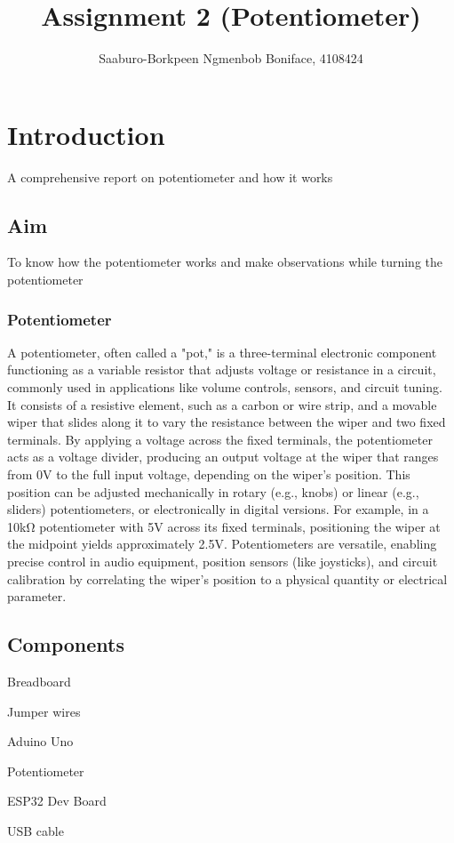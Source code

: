 \documentclass{article}
\title{Assignment 2 (Potentiometer)}
\author{Saaburo-Borkpeen Ngmenbob Boniface, 4108424}
\begin{document}
\maketitle


\section{Introduction}

A comprehensive report on potentiometer and how it works

\subsection{Aim}

To know how the potentiometer works and make observations while turning the potentiometer

\subsubsection{Potentiometer}
A potentiometer, often called a "pot," is a three-terminal electronic component functioning as a variable resistor that adjusts voltage or resistance in a circuit, commonly used in applications like volume controls, sensors, and circuit tuning. It consists of a resistive element, such as a carbon or wire strip, and a movable wiper that slides along it to vary the resistance between the wiper and two fixed terminals. By applying a voltage across the fixed terminals, the potentiometer acts as a voltage divider, producing an output voltage at the wiper that ranges from 0V to the full input voltage, depending on the wiper’s position. This position can be adjusted mechanically in rotary (e.g., knobs) or linear (e.g., sliders) potentiometers, or electronically in digital versions. For example, in a 10kΩ potentiometer with 5V across its fixed terminals, positioning the wiper at the midpoint yields approximately 2.5V. Potentiometers are versatile, enabling precise control in audio equipment, position sensors (like joysticks), and circuit calibration by correlating the wiper’s position to a physical quantity or electrical parameter.
\subsection{Components}

 \item  Breadboard
 \item  Jumper wires
 \item  Aduino Uno
 \item  Potentiometer
 \item  ESP32 Dev Board
 \item  USB cable
\end{document}
